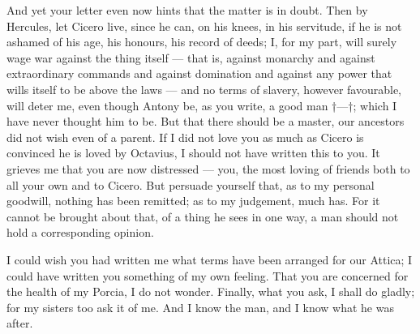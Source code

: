  And yet your letter even now hints that the matter is in doubt. Then by Hercules, let Cicero live, since he can, on his knees, in his servitude, if he is not ashamed of his age, his honours, his record of deeds; I, for my part, will surely wage war against the thing itself --- that is, against monarchy and against extraordinary commands and against domination and against any power that wills itself to be above the laws --- and no terms of slavery, however favourable, will deter me, even though Antony be, as you write, a good man †---†; which I have never thought him to be. But that there should be a master, our ancestors did not wish even of a parent. If I did not love you as much as Cicero is convinced he is loved by Octavius, I should not have written this to you. It grieves me that you are now distressed --- you, the most loving of friends both to all your own and to Cicero. But persuade yourself that, as to my personal goodwill, nothing has been remitted; as to my judgement, much has. For it cannot be brought about that, of a thing he sees in one way, a man should not hold a corresponding opinion.

 I could wish you had written me what terms have been arranged for our Attica; I could have written you something of my own feeling. That you are concerned for the health of my Porcia, I do not wonder. Finally, what you ask, I shall do gladly; for my sisters too ask it of me. And I know the man, and I know what he was after.

